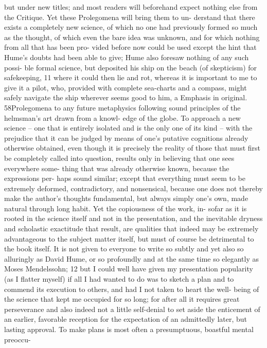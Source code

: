 but under new titles; and most readers will beforehand expect nothing
else from the Critique. Yet these Prolegomena will bring them to un-
derstand that there exists a completely new science, of which no one
had previously formed so much as the thought, of which even the bare
idea was unknown, and for which nothing from all that has been pro-
vided before now could be used except the hint that Hume’s doubts
had been able to give; Hume also foresaw nothing of any such possi-
ble formal science, but deposited his ship on the beach (of skepticism)
for safekeeping, 11 where it could then lie and rot, whereas it is important
to me to give it a pilot, who, provided with complete sea-charts and a
compass, might safely navigate the ship wherever seems good to him,
a
Emphasis in original.
58Prolegomena to any future metaphysics
following sound principles of the helmsman’s art drawn from a knowl-
edge of the globe.
To approach a new science – one that is entirely isolated and is the
only one of its kind – with the prejudice that it can be judged by means
of one’s putative cognitions already otherwise obtained, even though
it is precisely the reality of those that must ﬁrst be completely called
into question, results only in believing that one sees everywhere some-
thing that was already otherwise known, because the expressions per-
haps sound similar; except that everything must seem to be extremely
deformed, contradictory, and nonsensical, because one does not thereby
make the author’s thoughts fundamental, but always simply one’s own,
made natural through long habit. Yet the copiousness of the work, in-
sofar as it is rooted in the science itself and not in the presentation, and
the inevitable dryness and scholastic exactitude that result, are qualities
that indeed may be extremely advantageous to the subject matter itself,
but must of course be detrimental to the book itself.
It is not given to everyone to write so subtly and yet also so alluringly as
David Hume, or so profoundly and at the same time so elegantly as Moses
Mendelssohn; 12 but I could well have given my presentation popularity
(as I ﬂatter myself) if all I had wanted to do was to sketch a plan and to
commend its execution to others, and had I not taken to heart the well-
being of the science that kept me occupied for so long; for after all it
requires great perseverance and also indeed not a little self-denial to set
aside the enticement of an earlier, favorable reception for the expectation
of an admittedly later, but lasting approval.
To make plans is most often a presumptuous, boastful mental preoccu-
